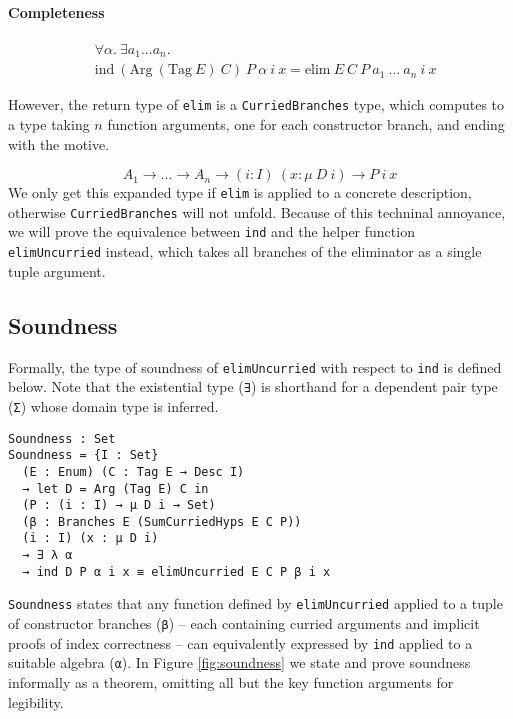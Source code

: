 \documentclass[preprint,nonatbib]{sigplanconf}
\newcommand{\reffig}[1]{Figure \ref{fig:#1}}
\begin{document}
\paragraph{Completeness}

\begin{align*}
&\forall \alpha. ~ \exists a_1 ... a_n. \\
&\textrm{ind} ~ (\textrm{Arg} ~ (\textrm{Tag} ~ E) ~ C) ~ P ~ \alpha ~ i ~ x =
\textrm{elim} ~ E ~ C ~ P ~ a_1 ~ ... ~ a_n ~ i ~ x
\end{align*}

However, the return type of {\tt elim} is a {\tt CurriedBranches} type,
which computes to a type taking $n$ function arguments, 
one for each constructor branch,
and ending with the motive.

\[
A_1 → ... → A_n → (i : I) ~ (x : \mu ~ D ~ i) → P ~ i ~ x
\]
\linebreak
We only get this expanded type if {\tt elim} is applied to a concrete
description, otherwise {\tt CurriedBranches} will not unfold. Because
of this techninal annoyance, we will prove the equivalence between
{\tt ind} and the helper function {\tt elimUncurried} instead, which
takes all branches of the eliminator as a single tuple argument.

\subsection{Soundness}

Formally, the type of soundness of {\tt elimUncurried} with respect to
{\tt ind} is defined below.
Note that the existential type ({\tt ∃}) is
shorthand for a dependent pair type ({\tt Σ}) whose domain type is
inferred.

\begin{verbatim}
Soundness : Set
Soundness = {I : Set}
  (E : Enum) (C : Tag E → Desc I)
  → let D = Arg (Tag E) C in
  (P : (i : I) → μ D i → Set)
  (β : Branches E (SumCurriedHyps E C P))
  (i : I) (x : μ D i)
  → ∃ λ α
  → ind D P α i x ≡ elimUncurried E C P β i x
\end{verbatim}

{\tt Soundness} states that any function defined by
{\tt elimUncurried} applied to a tuple of constructor branches
({\tt β}) --
each containing curried arguments and implicit proofs of index
correctness -- can equivalently expressed by {\tt ind} applied to a
suitable algebra ({\tt α}). 
In \reffig{soundness} we state and prove soundness informally
as a theorem, omitting all but the key function arguments for legibility.
\end{document}

